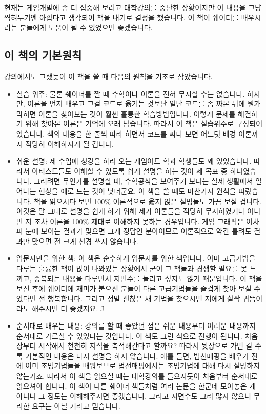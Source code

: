 현재는 게임개발에 좀 더 집중해 보려고 대학강의를 중단한 상황이지만 이 내용을 그냥 썩혀두기엔 아깝다고 생각되어 책을 내기로 결정을 했습니다. 이 책이 쉐이더를 배우시려는 분들에게 도움이 될 수 있었으면 좋겠습니다.

\subsection{이 책의 기본원칙}

강의에서도 그랬듯이 이 책을 쓸 때 다음의 원칙을 기초로 삼았습니다.

\begin{itemize}
    \item 실습 위주: 물론 쉐이더를 짤 때 수학이나 이론을 전혀 무시할 수는 없습니다. 하지만, 이론을 먼저 배우고 그걸 코드로 옮기는 것보단 일단 코드를 좀 짜본 뒤에 뭔가 막히면 이론을 찾아보는 것이 훨씬 훌륭한 학습방법입니다. 이렇게 문제를 해결하기 위해 찾아본 이론은 기억에 오래 남습니다. 따라서 이 책은 실습위주로 구성되어있습니다. 책의 내용을 한 줄씩 따라 하면서 코드를 짜다 보면 어느덧 배경 이론까지 적당히 이해하시게 될 겁니다.
    \item 쉬운 설명: 제 수업에 청강을 하러 오는 게임아트 학과 학생들도 꽤 있었습니다. 따라서 아티스트들도 이해할 수 있도록 쉽게 설명을 하는 것이 제 목표 중 하나였습니다. 그러려면 무언가를 설명할 때, 수학공식을 보여주기 보다는 실제 생활에서 일어나는 현상을 예로 드는 것이 낫더군요. 이 책을 쓸 때도 마찬가지 원칙을 따랐습니다. 책을 읽으시다 보면 100$\%$ 이론적으로 옳지 않은 설명들도 가끔 보실 겁니다. 이것은 말 그대로 설명을 쉽게 하기 위해 제가 이론들을 적당히 무시하였거나 아니면 저 조차 이론을 100$\%$ 제대로 이해하지 못하는 경우입니다. 게임 그래픽은 어차피 눈에 보이는 결과가 맞으면 그게 정답인 분야이므로 이론적으로 약간 틀려도 결과만 맞으면 전 크게 신경 쓰지 않습니다.
    \item 입문자만을 위한 책: 이 책은 순수하게 입문자를 위한 책입니다. 이미 고급기법을 다루는 훌륭한 책이 많이 나와있는 상황에서 굳이 그 책들과 경쟁할 필요를 못 느끼고, 중복되는 내용을 다루면서 지면수를 늘리고 싶지도 않기 때문입니다. 이 책을 보신 후에 쉐이더에 재미가 붙으신 분들이 다른 고급기법들을 즐겁게 찾아 보실 수 있다면 전 행복합니다. 그리고 정말 괜찮은 새 기법을 찾으시면 저에게 살짝 귀뜸이라도 해주시면 더 좋겠지요. ^^
    \item 순서대로 배우는 내용: 강의를 할 때 좋았던 점은 쉬운 내용부터 어려운 내용까지 순서대로 가르칠 수 있었다는 것입니다. 이 책도 그런 식으로 진행이 됩니다. 처음 장부터 시작해서 천천히 지식을 축적해간다고 할까요? 따라서 뒷장으로 가면 갈 수록 기본적인 내용은 다시 설명을 하지 않습니다. 예를 들면, 법선매핑을 배우기 전에 이미 조명기법들을 배워보므로 법선매핑에서는 조명기법에 대해 다시 설명하지 않는거죠. 따라서 이 책을 읽으실 때는 대학강의를 들으시듯이 처음부터 순서대로 읽으셔야 합니다. 이 책이 다른 쉐이더 책들처럼 여러 논문을 한군데 모아놓은 게 아니니 그 정도는 이해해주시면 좋겠습니다. 그리고 지면수도 그리 많지 않으니 무리한 요구는 아닐 거라고 믿습니다.
\end{itemize}


